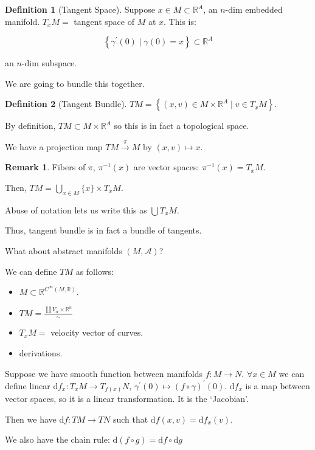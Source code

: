 \documentclass{article}
\theoremstyle{definition}
\newtheorem*{definition}{Definition}
\newtheorem*{remark}{Remark}
\begin{document}
    \begin{definition}
        [Tangent Space] Suppose \(x\in M \subset \mathbb{R}^A\), an \(n\)-dim embedded manifold. \(T_x M =\) tangent space of \(M\) at \(x\). This is:
        
        \[
            \left\{ \gamma ^{\prime} (0) \mid \gamma(0) = x \right\} \subset \mathbb{R}^A
        \]

        an \(n\)-dim subspace.
    \end{definition}

    We are going to bundle this together.

    \begin{definition}
        [Tangent Bundle]

        \(TM = \left\{ (x,v) \in M \times \mathbb{R}^A \mid v\in T_x M \right\}\).

        By definition, \(TM \subset M \times \mathbb{R}^A\) so this is in fact a topological space.

        We have a projection map \(TM \xrightarrow{\pi} M\) by \((x,v) \mapsto x\).
    \end{definition}

    \begin{remark}
        Fibers of \(\pi\), \(\pi ^{-1} (x)\) are vector spaces: \(\pi ^{-1} (x) = T_x M\).

        Then, \(TM = \bigcup_{x\in M} \{ x \} \times T_x M\).

        Abuse of notation lets us write this as \(\bigcup T_x M\).

        Thus, tangent bundle is in fact a bundle of tangents.
    \end{remark}

    What about abstract manifolds \((M,\mathcal{A})\)?

    We can define \(TM\) as follows:

    \begin{itemize}
        \item \(M \subset \mathbb{R}^{C^{\infty}(M,\mathbb{R})}\).
        \item \(TM = \frac{\coprod V_\alpha \times \mathbb{R}^n}{\sim}\)
        \item \(T_x M =\) velocity vector of curves.
        \item derivations.
    \end{itemize} 

    Suppose we have smooth function between manifolds \(f: M \to N\). \(\forall x\in M\) we can define linear \(\mathrm{d}f_x : T_x M \to T_{f(x)} N\), \(\gamma ^{\prime} (0) \mapsto (f \circ \gamma)^{\prime} (0)\). \(\mathrm{d} f_x\) is a map between vector spaces, so it is a linear transformation. It is the `Jacobian'.
    
    Then we have \(\mathrm{d} f: TM \to TN\) such that \(\mathrm{d} f(x,v) = \mathrm{d} f_x(v)\).

    We also have the chain rule: \(\mathrm{d} (f \circ g) = \mathrm{d} f \circ \mathrm{d} g\) 
\end{document}
